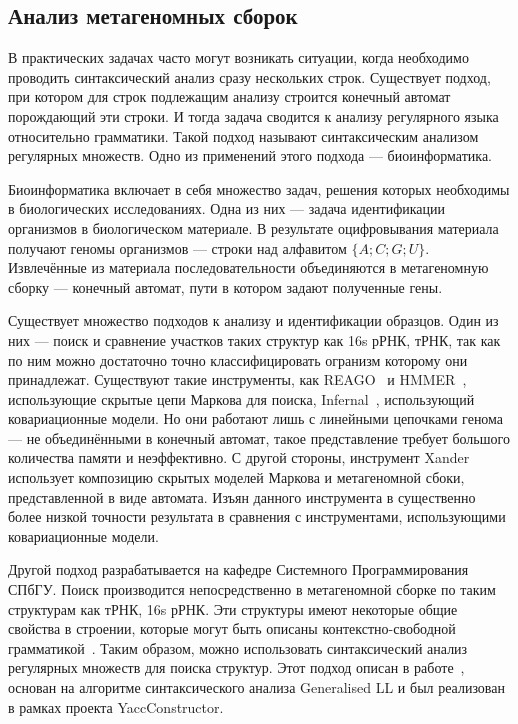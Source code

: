 \documentclass[14pt]{matmex-diploma-custom}
\begin{document}
	\subsection{Анализ метагеномных сборок}
	В практических задачах часто могут возникать ситуации, когда необходимо проводить синтаксический анализ 
    сразу нескольких строк. Существует подход, при котором для строк подлежащим анализу строится 
    конечный автомат порождающий эти строки. И тогда задача сводится к анализу регулярного языка относительно 
    грамматики. Такой подход называют синтаксическим анализом регулярных множеств. Одно из применений этого подхода ---
    биоинформатика.
    
    Биоинформатика включает в себя множество задач, решения которых необходимы в биологических исследованиях.
    Одна из них --- задача идентификации организмов в биологическом материале. В результате оцифровывания материала получают
    геномы организмов --- строки над алфавитом $\{A;C; G; U\}$.
    Извлечённые из материала последовательности объединяются в метагеномную сборку --- конечный автомат, пути в котором задают полученные 
    гены.
    
    Существует множество подходов к анализу и идентификации образцов. Один из них --- поиск и сравнение участков таких структур как
    16s рРНК, тРНК, так как по ним можно достаточно точно классифицировать огранизм которому они принадлежат.
    Существуют такие инструменты, как REAGO~\cite{reago} и HMMER~\cite{hmmer}, использующие скрытые цепи Маркова для поиска, 
    Infernal~\cite{Infernal}, использующий ковариационные модели. Но они работают лишь с линейными цепочками генома ---
    не объединёнными в конечный автомат,
    такое представление требует большого количества памяти и неэффективно. С другой стороны, инструмент Xander~\cite{xander} использует 
    композицию скрытых моделей Маркова и метагеномной сбоки, представленной в виде автомата. Изъян данного инструмента в существенно 
    более низкой точности результата в сравнения с инструментами, использующими ковариационные модели.
    
    Другой подход разрабатывается на кафедре Системного Программирования СПбГУ.
    Поиск производится непосредственно в метагеномной сборке по таким структурам как тРНК, 16s рРНК.
    Эти структуры имеют некоторые общие свойства в строении, которые могут быть описаны
    контекстно-свободной грамматикой~\cite{Anderson2013}.
    Таким образом, можно использовать синтаксический анализ регулярных множеств для поиска структур.
	Этот подход описан в работе~\cite{ragozina}, основан на алгоритме синтаксического анализа Generalised LL и 
    был реализован в рамках проекта YaccConstructor.
	
\end{document}
